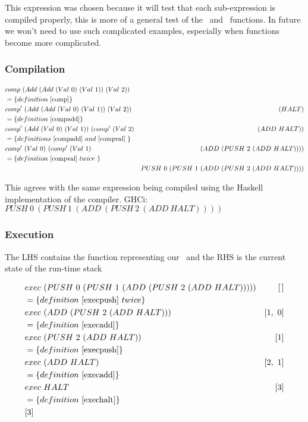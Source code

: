\documentclass {article}
\begin{document}
This expression was chosen because it 
will test that each sub-expression
is compiled properly, 
this is more of a general test of the
\comp\ and \compp\ functions. 
In future we won't need to use
such complicated examples, 
especially when functions become more complicated.

\subsubsection{Compilation}

\begin{align*}
&comp\ (Add\ (Add\ (Val\ 0)\ (Val\ 1))\ (Val\ 2)) \\
&= \{ definition\ \ref{comp} \} \\
&comp'\ (Add\ (Add\ (Val\ 0)\ (Val\ 1))\ (Val\ 2))\ 			&(HALT) \\
&= \{ definition\ \ref{compadd} \} \\
&comp'\ (Add\ (Val\ 0)\ (Val\ 1))\ (comp'\ (Val\ 2) 	  &(ADD\ HALT)) \\
&= \{ definitions\ \ref{compadd}\ and\ \ref{compval}\ \} \\
&comp'\ (Val\ 0)\ (comp'\ (Val\ 1)\		&(ADD\ (PUSH\ 2\ (ADD\ HALT)))) \\
&= \{ definition\ \ref{compval}\ twice\ \} \\
&					 &PUSH\ 0\ (PUSH\ 1\ (ADD\ (PUSH\ 2\ (ADD\ HALT)))) \\
\end{align*}

This agrees with the same expression being compiled
using the Haskell implementation of the compiler.
GHCi: \( PUSH\ 0\ (PUSH\ 1\ (ADD\ (PUSH\ 2\ (ADD\ HALT)))) \)

\subsubsection{Execution}

The LHS contains the function representing our \vm\
and the RHS is the current state of the run-time stack

\begin{align*}
&exec\ (PUSH\ 0\ (PUSH\ 1\ (ADD\ (PUSH\ 2\ (ADD\ HALT))))) &[\, ] \\
&= \{ definition\ \ref{execpush}\ twice \} \\
&exec\ (ADD\ (PUSH\ 2\ (ADD\ HALT))) 					&[1,\ 0] \\
&= \{ definition\ \ref{execadd} \} \\
&exec\ (PUSH\ 2\ (ADD\ HALT)) 								&[1] \\
&= \{ definition\ \ref{execpush} \} \\
&exec\ (ADD\ HALT)										 &[2,\ 1] \\
&= \{ definition\ \ref{execadd} \} \\
&exec\ HALT 												&[3] \\
&= \{ definition\ \ref{exechalt} \} \\
&[3]
\end{align*}
\end{document}
